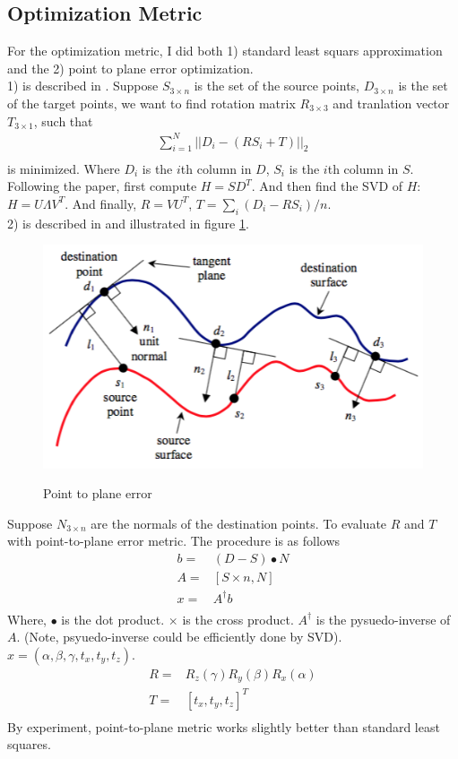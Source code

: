 \documentclass[letterpaper, 10 pt, conference]{ieeeconf}  %
\begin{document}
\subsection{Optimization Metric}
For the optimization metric, I did both 1) standard least squars approximation and the 2) point to plane error optimization. \\
1) is described in \cite{c3}. Suppose $S_{3\times n}$ is the set of the source points, $D_{3\times n}$ is the set of the target points, we want to find rotation matrix $R_{3\times 3}$ and tranlation vector $T_{3\times 1}$, such that \\
\begin{align*}
\sum_{i=1}^N ||D_i - (RS_i + T)||_2\\
\end{align*}
is minimized. Where $D_i$ is the $i$th column in $D$, $S_i$ is the $i$th column in $S$. Following the paper, first compute $H = SD^T$. And then find the SVD of $H$: $H = U\Lambda V^T$. And finally, $R = VU^T$, $T = \sum_i(D_i-RS_i)/n$.\\
2) is described in \cite{c2} and illustrated in figure \ref{fig:p2p}.
\begin{figure}
\centering
\includegraphics[width=\columnwidth]{p2plane.png}\\
\caption{Point to plane error}
\label{fig:p2p}
\end{figure}
Suppose $N_{3\times n}$ are the normals of the destination points. To evaluate $R$ and $T$ with point-to-plane error metric. The procedure is as follows\\
\begin{align*}
b =& (D-S)\bullet N\\
A =& [S\times n, N]\\
x =& A^{\dagger} b\\
\end{align*}
Where, $\bullet$ is the dot product. $\times$ is the cross product. $A^\dagger$ is the pysuedo-inverse of $A$. (Note, psyuedo-inverse could be efficiently done by SVD). $x = (\alpha, \beta, \gamma, t_x, t_y, t_z)$.\\
\begin{align*}
R =& R_z(\gamma)R_y(\beta)R_x(\alpha)\\
T =& [t_x, t_y, t_z]^T\\
\end{align*}
By experiment, point-to-plane metric works slightly better than standard least squares.\\
\end{document}
